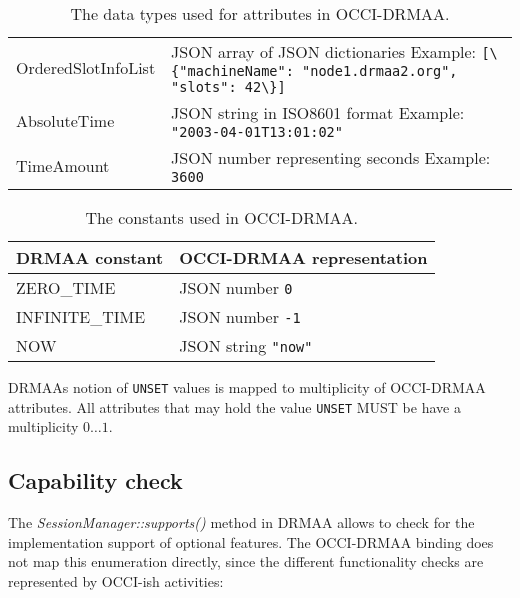\documentclass[10pt]{article}
\newcommand{\h}[1]{\lstinline|#1|}
\newcommand{\rat}[1]{}
\begin{document}
\begin{table}[ht]
\begin{tabularx}{\textwidth}{|l|>{\raggedright\arraybackslash}X|}
OrderedSlotInfoList    & JSON array of JSON dictionaries \linebreak Example:  \h{[\{"machineName": "node1.drmaa2.org", "slots": 42\}]} \\
AbsoluteTime           & JSON string in ISO8601 format \linebreak Example:  \h{"2003-04-01T13:01:02"} \\
TimeAmount             & JSON number representing seconds \linebreak Example:  \h{3600} \\
\hline
\end{tabularx}
\caption{The data types used for attributes in OCCI-DRMAA.}
\label{tab:datatypes}
\end{table}


\rat{ReservationList is not needed in the mapping, since OCCI links are used for that in all occasions.}

\begin{table}[ht]
\centering
\begin{tabularx}{\textwidth}{|l|>{\raggedright\arraybackslash}X|}
\hline
DRMAA constant & OCCI-DRMAA representation\\
\hline
ZERO\_TIME     & JSON number \h{0} \\
INFINITE\_TIME & JSON number \h{-1} \\
NOW            & JSON string \h{"now"} \\
\hline
\end{tabularx}
\caption{The constants used in OCCI-DRMAA. }
\label{tab:constants}
\end{table}

DRMAAs notion of \h{UNSET} values is mapped to multiplicity of OCCI-DRMAA attributes. All attributes that may hold the value \h{UNSET} MUST be have a multiplicity $0\ldots1$.

\subsection{Capability check}
\label{sec:drmaacapability}

The \emph{SessionManager::supports()} method in DRMAA allows to check for the implementation support of optional features.  The OCCI-DRMAA binding does not map this enumeration directly, since the different functionality checks are represented by OCCI-ish activities:
\end{document}
